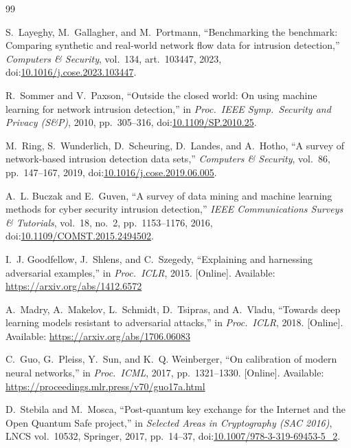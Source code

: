 \documentclass{ieeeaccess}
\begin{document}

\begin{thebibliography}{99}

S.~Layeghy, M.~Gallagher, and M.~Portmann,
``Benchmarking the benchmark: Comparing synthetic and real-world network
flow data for intrusion detection,''
\emph{Computers \& Security}, vol.~134, art.~103447, 2023,
doi:\href{https://doi.org/10.1016/j.cose.2023.103447}{10.1016/j.cose.2023.103447}.

R.~Sommer and V.~Paxson,
``Outside the closed world: On using machine learning for network
intrusion detection,''
in \emph{Proc.\ IEEE Symp.\ Security and Privacy (S\&P)}, 2010,
pp.~305--316,
doi:\href{https://doi.org/10.1109/SP.2010.25}{10.1109/SP.2010.25}.

M.~Ring, S.~Wunderlich, D.~Sche\-uring, D.~Landes, and A.~Hotho,
``A survey of network-based intrusion detection data sets,''
\emph{Computers \& Security}, vol.~86, pp.~147--167, 2019,
doi:\href{https://doi.org/10.1016/j.cose.2019.06.005}{10.1016/j.cose.2019.06.005}.

A.~L. Buczak and E.~Guven,
``A survey of data mining and machine learning methods for cyber
security intrusion detection,''
\emph{IEEE Communications Surveys \& Tutorials}, vol.~18, no.~2,
pp.~1153--1176, 2016,
doi:\href{https://doi.org/10.1109/COMST.2015.2494502}{10.1109/COMST.2015.2494502}.

I.~J. Goodfellow, J.~Shlens, and C.~Szegedy,
``Explaining and harnessing adversarial examples,''
in \emph{Proc.\ ICLR}, 2015. [Online]. Available:
\url{https://arxiv.org/abs/1412.6572}

A.~Madry, A.~Makelov, L.~Schmidt, D.~Tsipras, and A.~Vladu,
``Towards deep learning models resistant to adversarial attacks,''
in \emph{Proc.\ ICLR}, 2018. [Online]. Available:
\url{https://arxiv.org/abs/1706.06083}

C.~Guo, G.~Pleiss, Y.~Sun, and K.~Q. Weinberger,
``On calibration of modern neural networks,''
in \emph{Proc.\ ICML}, 2017, pp.~1321--1330. [Online]. Available:
\url{https://proceedings.mlr.press/v70/guo17a.html}

D.~Stebila and M.~Mosca,
``Post-quantum key exchange for the Internet and the Open Quantum Safe
project,''
in \emph{Selected Areas in Cryptography (SAC 2016)}, LNCS vol.~10532,
Springer, 2017, pp.~14--37,
doi:\href{https://doi.org/10.1007/978-3-319-69453-5_2}{10.1007/978-3-319-69453-5\_2}.


\end{thebibliography}
\end{document}
